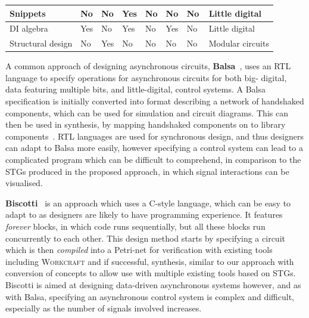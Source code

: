 \documentclass[british,compsoc]{IEEEtran}
\newcommand{\noun}[1]{\textsc{#1}}
\begin{document}
\begin{table}[t]
\begin{tabular}[htb]{| m{1.5cm} | m{2cm} | m{1.3cm} | m{1.75cm} | m{1.5cm} | m{1.5cm} | m{1.7cm} | m{1.15cm} |}
  Snippets                & No                                & No                   & Yes               & No                        & No                          & No                                & \,Little digital \\ \hline
  DI algebra             & Yes                               & No                   & Yes               & No                        & Yes                         & No                               & \,Little digital \\ \hline
  Structural design   & No                                & Yes                 & No                 & No                        & No                          & No                               & \,Modular circuits \\ \hline
  \end{tabular}
\end{table}

A common approach of designing asynchronous circuits, \textbf{Balsa}~\cite{edwards2002balsa}, uses an RTL language to specify operations for asynchronous circuits for both big-
digital, data featuring multiple bits, and little-digital, control systems. A Balsa specification is initially converted into format describing a network of handshaked components, which can be
used for simulation and circuit diagrams. This can then be used in synthesis, by mapping handshaked components on to library components~\cite{van1993handshake}. RTL languages
are used for synchronous design, and thus designers can adapt to Balsa more easily, however specifying a control system can lead to a complicated program which can be difficult to
comprehend, in comparison to the STGs produced in the proposed approach, in which signal interactions can be visualised.

\textbf{Biscotti}~\cite{5232351} is an approach which uses a C-style language, which can be easy to adapt to as designers are likely to have programming experience. It features
\emph{forever} blocks, in which code runs sequentially, but all these blocks run concurrently to each other. This design method starts by specifying a circuit which is then
\emph{compiled} into a Petri-net for verification with existing tools including \noun{Workcraft} and if successful, synthesis, similar to our approach with conversion of concepts to allow
use with multiple existing tools based on STGs. Biscotti is aimed at designing data-driven asynchronous systems however, and as with Balsa, specifying an asynchronous control system is
complex and difficult, especially as the number of signals involved increases.
\end{document}
